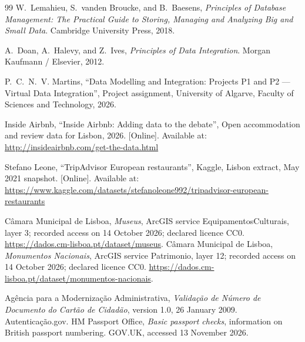 \documentclass[11pt,a4paper]{article}
\begin{document}
\hypersetup{pageanchor=false}


\hypersetup{pageanchor=true}


\newpage
{
\tableofcontents
\vspace{0.4cm}
\listoffigures
\vspace{0.3cm}
\listoftables
}
\newpage











\newpage
\begin{thebibliography}{99}
W.~Lemahieu, S.~vanden Broucke, and B.~Baesens, \emph{Principles of Database Management: The Practical Guide to Storing, Managing and Analyzing Big and Small Data}. Cambridge University Press, 2018.

A.~Doan, A.~Halevy, and Z.~Ives, \emph{Principles of Data Integration}. Morgan Kaufmann / Elsevier, 2012.

P.~C.~N.~V. Martins, ``Data Modelling and Integration: Projects P1 and P2 --- Virtual Data Integration'', Project assignment, University of Algarve, Faculty of Sciences and Technology, 2026.

Inside Airbnb, ``Inside Airbnb: Adding data to the debate'', Open accommodation and review data for Lisbon, 2026. [Online]. Available at: \url{http://insideairbnb.com/get-the-data.html}

Stefano Leone, ``TripAdvisor European restaurants'', Kaggle, Lisbon extract, May 2021 snapshot. [Online]. Available at: \url{https://www.kaggle.com/datasets/stefanoleone992/tripadvisor-european-restaurants}

Câmara Municipal de Lisboa, \emph{Museus}, ArcGIS service EquipamentosCulturais, layer 3; recorded access on 14 October 2026; declared licence CC0. \url{https://dados.cm-lisboa.pt/dataset/museus}.
Câmara Municipal de Lisboa, \emph{Monumentos Nacionais}, ArcGIS service Patrimonio, layer 12; recorded access on 14 October 2026; declared licence CC0. \url{https://dados.cm-lisboa.pt/dataset/monumentos-nacionais}.

Agência para a Modernização Administrativa, \emph{Validação de Número de Documento do Cartão de Cidadão}, version 1.0, 26 January 2009. Autenticação.gov.
HM Passport Office, \emph{Basic passport checks}, information on British passport numbering. GOV.UK, accessed 13 November 2026.
\end{thebibliography}
\appendix

\end{document}
